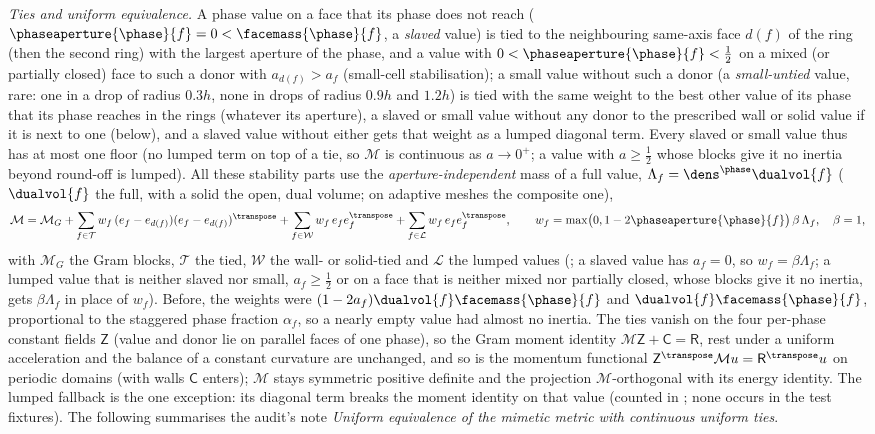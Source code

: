 \emph{Ties and uniform equivalence.} A phase value on a face that its phase
does not reach ($\phaseaperture{\phase}{f}=0<\facemass{\phase}{f}$, a
\emph{slaved} value) is tied to the neighbouring same-axis face $d(f)$ of the
ring (then the second ring) with the largest aperture of the phase, and a
value with $0<\phaseaperture{\phase}{f}<\tfrac12$ on a mixed (or partially
closed) face to such a donor with $a_{d(f)}>a_f$ (small-cell stabilisation);
a small value without such a donor (a \emph{small-untied} value, rare: one in
a drop of radius $0.3h$, none in drops of radius $0.9h$ and $1.2h$) is tied
with the same weight to the best other value of its phase that its phase
reaches in the rings (whatever its aperture), a slaved or small value without any
donor to the prescribed wall or solid value if it is next to one (below), and
a slaved value without either gets that weight as a lumped diagonal term.
Every slaved or small value thus has at most one floor (no lumped term on top
of a tie, so $\mathcal M$ is continuous as $a\to0^{+}$; a value with
$a\ge\tfrac12$ whose blocks give it no inertia beyond round-off is lumped).
All these stability parts use the \emph{aperture-independent} mass of a
full value, $\Lambda_f=\dens^{\phase}\dualvol{f}$ ($\dualvol{f}$ the full, with
a solid the open, dual volume; on adaptive meshes the composite one),
\begin{equation}\label{eq:projection:mimetic-ties}
  \mathcal M=\mathcal M_G+\sum_{f\in\mathcal T}w_f\,(e_f-e_{d(f)})(e_f-e_{d(f)})^{\transpose}
  +\sum_{f\in\mathcal W}w_f\,e_fe_f^{\transpose}+\sum_{f\in\mathcal L}w_f\,e_fe_f^{\transpose},
  \qquad w_f=\max\bigl(0,1-2\phaseaperture{\phase}{f}\bigr)\,\beta\,\Lambda_f,\quad\beta=1,
\end{equation}
with $\mathcal M_G$ the Gram blocks, $\mathcal T$ the tied, $\mathcal W$ the
wall- or solid-tied and $\mathcal L$ the lumped values (;
a slaved value has $a_f=0$, so $w_f=\beta\Lambda_f$; a lumped value that is
neither slaved nor small, $a_f\ge\tfrac12$ or on a face that is neither mixed
nor partially closed, whose blocks give it no inertia, gets $\beta\Lambda_f$ in
place of $w_f$). Before, the weights were
$(1-2a_f)\dualvol{f}\facemass{\phase}{f}$ and $\dualvol{f}\facemass{\phase}{f}$,
proportional to the staggered phase fraction $\alpha_f$, so a nearly empty value
had almost no inertia. The ties vanish on the four per-phase constant fields
$\mathsf Z$ (value and donor lie on parallel faces of one phase), so the Gram
moment identity $\mathcal M\mathsf Z+\mathsf C=\mathsf R$, rest under a uniform
acceleration and the balance of a constant curvature are unchanged, and so is
the momentum functional $\mathsf Z^{\transpose}\mathcal Mu=\mathsf R^{\transpose}u$
on periodic domains (with walls $\mathsf C$ enters); $\mathcal M$
stays symmetric positive definite and the projection
$\mathcal M$-orthogonal with its energy identity. The lumped fallback is the one
exception: its diagonal term breaks the moment identity on that value
(counted in ; none occurs in the test fixtures). The
following summarises the audit's note \emph{Uniform equivalence of the
mimetic metric with continuous uniform ties}.


